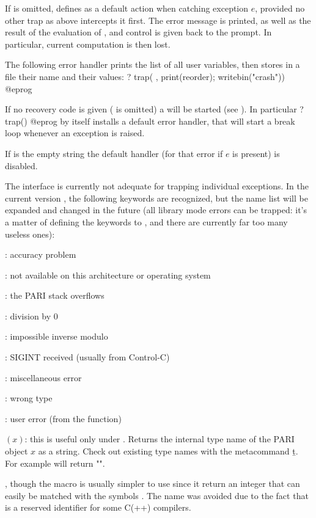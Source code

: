 If  is omitted, defines  as a default action when
catching exception $e$, provided no other trap as above intercepts it first.
The error message is printed, as well as the result of the evaluation of
, and control is given back to the  prompt. In particular, current
computation is then lost.

The following error handler prints the list of all user variables, then
stores in a file their name and their values:
\bprog
? { trap( ,
      print(reorder);
      writebin("crash")) }
@eprog

If no recovery code is given ( is omitted) a  will
be started (see ). In particular
\bprog
? trap()
@eprog
\noindent by itself installs a default error handler, that will start a break
loop whenever an exception is raised.

If  is the empty string  the default handler (for that error
if $e$ is present) is disabled.

 The interface is currently not adequate for trapping
individual exceptions. In the current version \vers, the following keywords
are recognized, but the name list will be expanded and changed in the
future (all library mode errors can be trapped: it's a matter of defining
the keywords to , and there are currently far too many useless ones):

: accuracy problem

: not available on this architecture or operating system

: the PARI stack overflows

: division by 0

: impossible inverse modulo

: SIGINT received (usually from Control-C)

: miscellaneous error

: wrong type

: user error (from the  function)

$(x)$: this is useful only under . Returns the
internal type name of the PARI object $x$ as a  string. Check out
existing type names with the metacommand \b{t}.\label{se:gptype}
For example  will return "".

, though the macro  is usually simpler to use
since it return an integer that can easily be matched with the symbols \typ{*}.
The name  was avoided due to the fact that  is a reserved identifier for some C(++) compilers.

